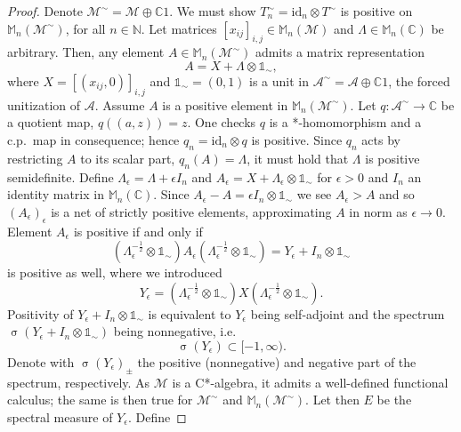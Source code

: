 \documentclass[reqno]{amsart}
\theoremstyle{plain}
\numberwithin{equation}{section}
\numberwithin{theorem}{section}
\numberwithin{lemma}{section}
\numberwithin{definition}{section}
\numberwithin{corollary}{section}
\numberwithin{remark}{section}
\newcommand{\naturals}{\mathbb{N}}
\newcommand{\complexes}{\mathbb{C}}
\newcommand{\spec}[1]{\operatorname{\sigma}{\left(#1\right)}}
\newcommand{\id}[1]{\mathrm{id}_{#1}}
\newcommand{\matr}[1]{\mathbb{M}_{#1}(\complexes)}
\newcommand{\matra}[2]{\mathbb{M}_{#1}(#2)}
\newcommand{\unit}{\mathds{1}}
\begin{document}
\begin{proof}
    Denote $\mathscr{M}^\sim = \mathscr{M}\oplus\complexes 1$. We must show $T_{n}^{\sim} = \id{n}\otimes T^\sim$ is positive on $\matra{n}{\mathscr{M}^\sim}$, for all $n\in\naturals$. Let matrices $\left[x_{ij}\right]_{i,j} \in \matra{n}{\mathscr{M}}$ and $\Lambda \in \matr{n}$ be arbitrary. Then, any element $A \in \matra{n}{\mathscr{M}^\sim}$ admits a matrix representation
    \begin{equation}
        A = X + \Lambda \otimes \unit_\sim ,
    \end{equation}
    where $X = \left[(x_{ij},0)\right]_{i,j}$ and $\unit_\sim = (0,1)$ is a unit in $\mathscr{A}^\sim = \mathscr{A}\oplus \complexes 1$, the forced unitization of $\mathscr{A}$. Assume $A$ is a positive element in $\matra{n}{\mathscr{M}^\sim}$. Let $q : \mathscr{A}^\sim \to \complexes$ be a quotient map, $q ((a,z)) = z$. One checks $q$ is a *-homomorphism and a c.p.~map in consequence; hence $q_n = \id{n}\otimes q$ is positive. Since $q_n$ acts by restricting $A$ to its scalar part, $q_n (A) = \Lambda$, it must hold that $\Lambda$ is positive semidefinite. Define $\Lambda_\epsilon = \Lambda + \epsilon I_n$ and $A_\epsilon = X + \Lambda_\epsilon \otimes \unit_\sim$ for $\epsilon > 0$ and $I_n$ an identity matrix in $\matr{n}$. Since $A_\epsilon - A = \epsilon I_n \otimes \unit_\sim$ we see $A_\epsilon > A$ and so $\left(A_\epsilon\right)_\epsilon$ is a net of strictly positive elements, approximating $A$ in norm as $\epsilon \to 0$. Element $A_\epsilon$ is positive if and only if
    \begin{equation}
        (\Lambda_{\epsilon}^{-\frac{1}{2}}\otimes \unit_\sim)A_\epsilon (\Lambda_{\epsilon}^{-\frac{1}{2}}\otimes \unit_\sim) = Y_\epsilon + I_n \otimes \unit_\sim
    \end{equation}
    is positive as well, where we introduced
    \begin{equation}
        Y_\epsilon = (\Lambda_{\epsilon}^{-\frac{1}{2}}\otimes \unit_\sim)X (\Lambda_{\epsilon}^{-\frac{1}{2}}\otimes \unit_\sim).
    \end{equation}
    Positivity of $Y_\epsilon + I_n \otimes \unit_\sim$ is equivalent to $Y_\epsilon$ being self-adjoint and the spectrum $\spec{Y_\epsilon + I_n \otimes \unit_\sim}$ being nonnegative, i.e.
    \begin{equation}
        \spec{Y_\epsilon} \subset [-1,\infty ).
    \end{equation}
    Denote with $\spec{Y_\epsilon}_\pm$ the positive (nonnegative) and negative part of the spectrum, respectively. As $\mathscr{M}$ is a C*-algebra, it admits a well-defined functional calculus; the same is then true for $\mathscr{M}^\sim$ and $\matra{n}{\mathscr{M}^\sim}$. Let then $E$ be the spectral measure of $Y_\epsilon$. Define

\end{proof}
\end{document}

